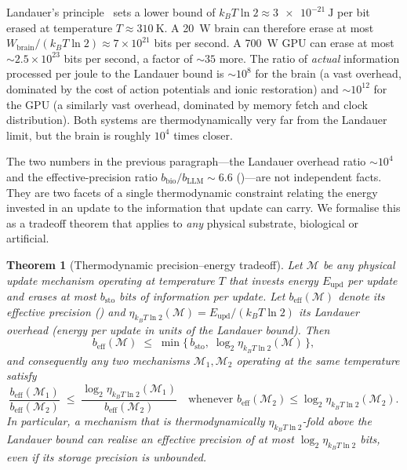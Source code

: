 \documentclass[11pt]{article}
\providecommand{\watt}{\ensuremath{\mathrm{W}}}
\providecommand{\joule}{\ensuremath{\mathrm{J}}}
\providecommand{\kelvin}{\ensuremath{\mathrm{K}}}
\newtheorem{theorem}{Theorem}
\theoremstyle{definition}
\theoremstyle{remark}
\newcommand{\Land}{k_{\!B}T\ln 2}
\newcommand{\Wbrain}{W_{\mathrm{brain}}}
\begin{document}
Landauer's principle~\cite{landauer1961irreversibility} sets a lower
bound of $k_{B}T\ln 2 \approx \SI{3e-21}{\joule}$ per bit erased at
temperature $T\approx\SI{310}{\kelvin}$.  A \SI{20}{\watt} brain can
therefore erase at most $\Wbrain/(k_{B}T\ln 2) \approx
7\times 10^{21}$ bits per second.  A \SI{700}{\watt} GPU can erase at
most $\sim 2.5\times 10^{23}$ bits per second, a factor of $\sim 35$
more.  The ratio of \emph{actual} information processed per joule to
the Landauer bound is $\sim 10^{8}$ for the brain (a vast overhead,
dominated by the cost of action potentials and ionic restoration) and
$\sim 10^{12}$ for the GPU (a similarly vast overhead, dominated by
memory fetch and clock distribution).  Both systems are
thermodynamically very far from the Landauer limit, but the brain is
roughly $10^{4}$ times closer.

The two numbers in the previous paragraph---the Landauer overhead
ratio $\sim\!10^{4}$ and the effective-precision ratio
$b_{\mathrm{bio}}/b_{\mathrm{LLM}}\sim 6.6$ ()---are not independent facts.  They are two facets of
a single thermodynamic constraint relating the energy invested in an
update to the information that update can carry.  We formalise this
as a tradeoff theorem that applies to \emph{any} physical substrate,
biological or artificial.

\begin{theorem}[Thermodynamic precision--energy tradeoff]
\label{thm:landauer-precision}
Let $\mathcal{M}$ be any physical update mechanism operating at
temperature $T$ that invests energy $E_{\mathrm{upd}}$ per update and
erases at most $b_{\mathrm{sto}}$ bits of information per update.
Let $b_{\mathrm{eff}}(\mathcal{M})$ denote its effective precision
() and $\eta_{\Land}(\mathcal{M})=E_{\mathrm{upd}}/(k_{B}T\ln 2)$
its Landauer overhead (energy per update in units of the Landauer
bound).  Then
\[
  b_{\mathrm{eff}}(\mathcal{M})\;\le\;\min\!\bigl\{\,b_{\mathrm{sto}},\;
  \log_{2}\eta_{\Land}(\mathcal{M})\,\bigr\},
\]
and consequently any two mechanisms $\mathcal{M}_{1},\mathcal{M}_{2}$
operating at the same temperature satisfy
\[
  \frac{b_{\mathrm{eff}}(\mathcal{M}_{1})}{b_{\mathrm{eff}}(\mathcal{M}_{2})}
  \;\le\;
  \frac{\log_{2}\eta_{\Land}(\mathcal{M}_{1})}{b_{\mathrm{eff}}(\mathcal{M}_{2})}
  \quad\text{whenever }b_{\mathrm{eff}}(\mathcal{M}_{2})\le
  \log_{2}\eta_{\Land}(\mathcal{M}_{2}).
\]
In particular, a mechanism that is thermodynamically
$\eta_{\Land}$-fold above the Landauer bound can realise an effective
precision of at most $\log_{2}\eta_{\Land}$ bits, \emph{even if its
storage precision is unbounded}.
\end{theorem}
\end{document}
